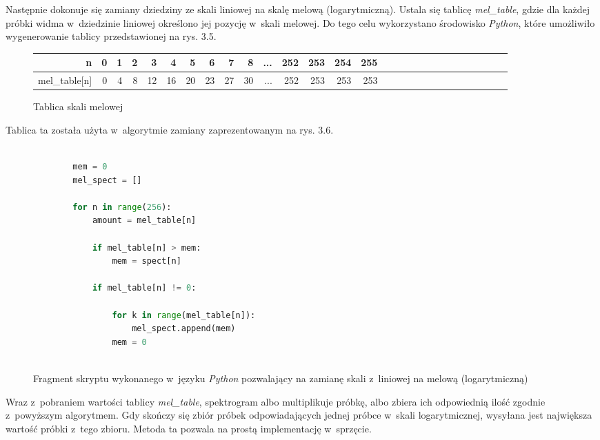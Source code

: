 Następnie dokonuje się zamiany dziedziny ze skali liniowej na skalę melową (logarytmiczną). Ustala się tablicę \textit{mel\_table}, gdzie dla każdej próbki widma w~dziedzinie liniowej określono jej pozycję w~skali melowej. Do tego celu wykorzystano środowisko \textit{Python}, które umożliwiło wygenerowanie tablicy przedstawionej na rys. 3.5.

\begin{figure}[h]
	\centering
	
	\begin{tabular}{|r|r|r|r|r|r|r|r|r|r|r|r|r|r|r|r|r|r|r|r|r|r|r|r|r|r|r|r|}
		\hline
		n		   & 0 & 1 & 2 & 3 & 4 & 5 & 6 & 7 & 8 & ...  & 252 & 253 & 254 & 255 \\
		\hline
		mel\_table[n]& 0 & 4 & 8 & 12 & 16 & 20 & 23 & 27 & 30 & ...    & 252   &   253 &   253 &   253 \\
		\hline
	\end{tabular}
	
	\caption{Tablica skali melowej}
\end{figure}

\FloatBarrier %

Tablica ta została użyta w~algorytmie zamiany zaprezentowanym na rys. 3.6.

\begin{figure}[h]
	\begin{lstlisting}[language=Python]
		
		mem = 0
		mel_spect = []
		
		for n in range(256):
			amount = mel_table[n]
			
			if mel_table[n] > mem:
				mem = spect[n]
				
			if mel_table[n] != 0:
				
				for k in range(mel_table[n]):
					mel_spect.append(mem)
				mem = 0
		
	\end{lstlisting}
	\caption{Fragment skryptu wykonanego w~języku \textit{Python} pozwalający na zamianę skali z~liniowej na melową (logarytmiczną)}
\end{figure}
\FloatBarrier %

Wraz z~pobraniem wartości tablicy \textit{mel\_table}, spektrogram albo multiplikuje próbkę, albo zbiera ich odpowiednią ilość zgodnie z~powyższym algorytmem. Gdy skończy się zbiór próbek odpowiadających jednej próbce w~skali logarytmicznej, wysyłana jest największa wartość próbki z~tego zbioru. Metoda ta pozwala na prostą implementację w~sprzęcie.

